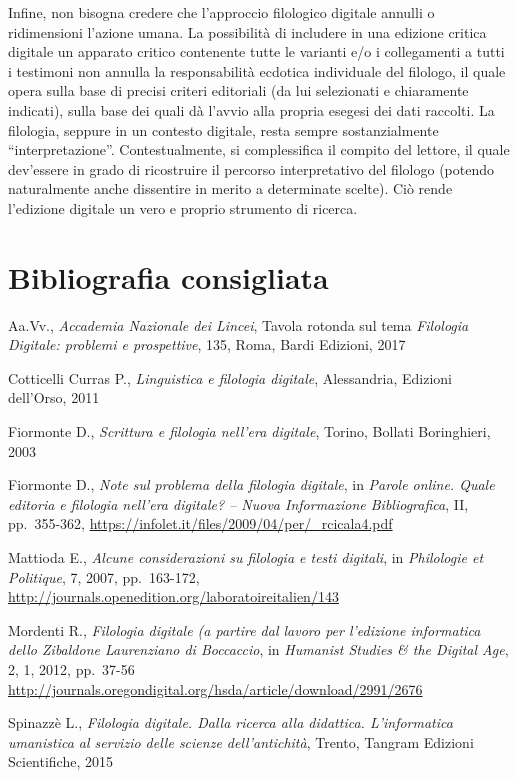 \documentclass[
  b5paper,
  twoside,
  12pt,
  chapterprefix=false,
  bibliography=totocnumbered,
  parskip=false]{scrbook}
\begin{document}
Infine, non bisogna credere che l'approccio filologico digitale annulli
o ridimensioni l'azione umana. La possibilità di includere in una
edizione critica digitale un apparato critico contenente tutte le
varianti e/o i collegamenti a tutti i testimoni non annulla la
responsabilità ecdotica individuale del filologo, il quale opera sulla
base di precisi criteri editoriali (da lui selezionati e chiaramente
indicati), sulla base dei quali dà l'avvio alla propria esegesi dei dati
raccolti. La filologia, seppure in un contesto digitale, resta sempre
sostanzialmente \enquote{interpretazione}. Contestualmente, si complessifica il
compito del lettore, il quale dev'essere in grado di ricostruire il
percorso interpretativo del filologo (potendo naturalmente anche
dissentire in merito a determinate scelte). Ciò rende l'edizione
digitale un vero e proprio strumento di ricerca.

\hypertarget{bibliografia-consigliata-10}{%
\section*{Bibliografia consigliata}\label{bibliografia-consigliata-10}}

Aa.Vv., \emph{Accademia Nazionale dei Lincei}, Tavola rotonda sul tema
\emph{Filologia Digitale: problemi e prospettive}, 135, Roma, Bardi Edizioni,
2017

Cotticelli Curras P., \emph{Linguistica e filologia digitale}, Alessandria,
Edizioni dell'Orso, 2011

Fiormonte D., \emph{Scrittura e filologia nell'era digitale}, Torino, Bollati
Boringhieri, 2003

Fiormonte D., \emph{Note sul problema della filologia digitale}, in \emph{Parole
online. Quale editoria e filologia nell'era digitale? -- Nuova
Informazione Bibliografica}, II, pp.~355-362,
\url{https://infolet.it/files/2009/04/per/_rcicala4.pdf}

Mattioda E., \emph{Alcune considerazioni su filologia e testi digitali}, in
\emph{Philologie et Politique}, 7, 2007, pp.~163-172,
\url{http://journals.openedition.org/laboratoireitalien/143}

Mordenti R., \emph{Filologia digitale (a partire dal lavoro per l'edizione
informatica dello Zibaldone Laurenziano di Boccaccio}, in \emph{Humanist
Studies \& the Digital Age}, 2, 1, 2012, pp.~37-56
\url{http://journals.oregondigital.org/hsda/article/download/2991/2676}

Spinazzè L., \emph{Filologia digitale. Dalla ricerca alla didattica.
L'informatica umanistica al servizio delle scienze dell'antichità},
Trento, Tangram Edizioni Scientifiche, 2015
\end{document}
